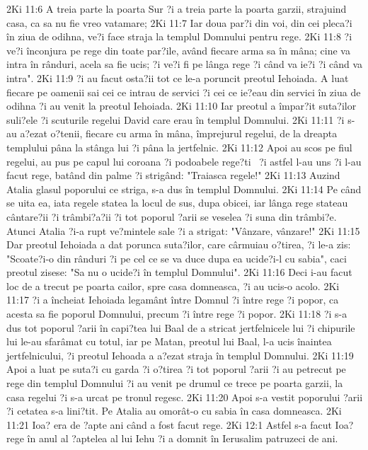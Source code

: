 2Ki 11:6  A treia parte la poarta Sur ?i a treia parte la poarta garzii, strajuind casa, ca sa nu fie vreo vatamare;
2Ki 11:7  Iar doua par?i din voi, din cei pleca?i în ziua de odihna, ve?i face straja la templul Domnului pentru rege.
2Ki 11:8  ?i ve?i înconjura pe rege din toate par?ile, având fiecare arma sa în mâna; cine va intra în rânduri, acela sa fie ucis; ?i ve?i fi pe lânga rege ?i când va ie?i ?i când va intra".
2Ki 11:9  ?i au facut osta?ii tot ce le-a poruncit preotul Iehoiada. A luat fiecare pe oamenii sai cei ce intrau de servici ?i cei ce ie?eau din servici în ziua de odihna ?i au venit la preotul Iehoiada.
2Ki 11:10  Iar preotul a împar?it suta?ilor suli?ele ?i scuturile regelui David care erau în templul Domnului.
2Ki 11:11  ?i s-au a?ezat o?tenii, fiecare cu arma în mâna, împrejurul regelui, de la dreapta templului pâna la stânga lui ?i pâna la jertfelnic.
2Ki 11:12  Apoi au scos pe fiul regelui, au pus pe capul lui coroana ?i podoabele rege?ti  ?i astfel l-au uns ?i l-au facut rege, batând din palme ?i strigând: "Traiasca regele!"
2Ki 11:13  Auzind Atalia glasul poporului ce striga, s-a dus în templul Domnului.
2Ki 11:14  Pe când se uita ea, iata regele statea la locul de sus, dupa obicei, iar lânga rege stateau cântare?ii ?i trâmbi?a?ii ?i tot poporul ?arii se veselea ?i suna din trâmbi?e. Atunci Atalia ?i-a rupt ve?mintele sale ?i a strigat: "Vânzare, vânzare!"
2Ki 11:15  Dar preotul Iehoiada a dat porunca suta?ilor, care cârmuiau o?tirea, ?i le-a zis: "Scoate?i-o din rânduri ?i pe cel ce se va duce dupa ea ucide?i-l cu sabia", caci preotul zisese: "Sa nu o ucide?i în templul Domnului".
2Ki 11:16  Deci i-au facut loc de a trecut pe poarta cailor, spre casa domneasca, ?i au ucis-o acolo.
2Ki 11:17  ?i a încheiat Iehoiada legamânt între Domnul ?i între rege ?i popor, ca acesta sa fie poporul Domnului, precum ?i între rege ?i popor.
2Ki 11:18  ?i s-a dus tot poporul ?arii în capi?tea lui Baal de a stricat jertfelnicele lui ?i chipurile lui le-au sfarâmat cu totul, iar pe Matan, preotul lui Baal, l-a ucis înaintea jertfelnicului, ?i preotul Iehoada a a?ezat straja în templul Domnului.
2Ki 11:19  Apoi a luat pe suta?i cu garda ?i o?tirea ?i tot poporul ?arii ?i au petrecut pe rege din templul Domnului ?i au venit pe drumul ce trece pe poarta garzii, la casa regelui ?i s-a urcat pe tronul regesc.
2Ki 11:20  Apoi s-a vestit poporului ?arii ?i cetatea s-a lini?tit. Pe Atalia au omorât-o cu sabia în casa domneasca.
2Ki 11:21  Ioa? era de ?apte ani când a fost facut rege.
2Ki 12:1  Astfel s-a facut Ioa? rege în anul al ?aptelea al lui Iehu ?i a domnit în Ierusalim patruzeci de ani.
